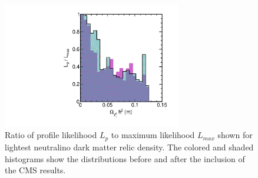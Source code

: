 \begin{figure}[htbp]
\begin{center}
\includegraphics[height=5.5cm]{figs/fig_omega_m.pdf} 
\caption{Ratio of profile likelihood $L_p$ to maximum likelihood $L_{max}$ shown for lightest neutralino dark matter relic density.  The colored and shaded histograms show the distributions before and after the inclusion of the CMS results.}
\label{fig:LRwcms_omg}
\end{center}
\end{figure}




